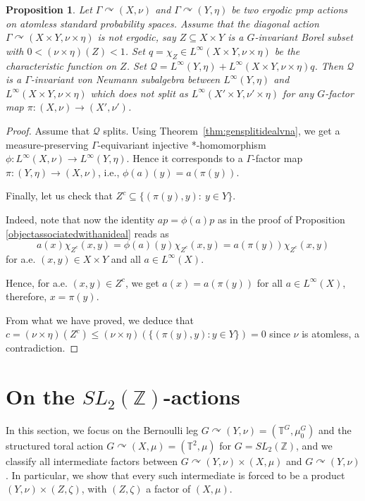 \documentclass[12pt]{amsart}
\newtheorem{proposition}[thm]{Proposition}
\theoremstyle{definition}
\begin{document}
\begin{proposition}
\label{prop:abelianvnanonsplitting}
Let $\Gamma\curvearrowright (X,\nu)$ and $\Gamma\curvearrowright (Y,\eta)$ be two  ergodic pmp actions on atomless standard probability spaces. Assume that the diagonal action $\Gamma\curvearrowright (X\times Y,\nu\times \eta)$ is not ergodic, say $Z\subseteq X\times Y$ is a $G$-invariant Borel subset with $0<(\nu\times\eta)(Z)<1$. Set $q=\chi_Z\in L^{\infty}(X\times Y,\nu\times\eta)$ be the characteristic function on $Z$.  Set $\mathcal{Q}=L^{\infty}(Y,\eta)+L^{\infty}(X\times Y,\nu\times\eta)q$. Then $\mathcal{Q}$ is a $\Gamma$-invariant von Neumann subalgebra between $L^{\infty}(Y,\eta)$ and $L^{\infty}(X\times Y,\nu\times\eta)$ which does not split as $L^{\infty}(X'\times Y,\nu'\times\eta)$ for any $G$-factor map $\pi: (X,\nu)\rightarrow (X',\nu')$.  
\end{proposition}
\begin{proof}
Assume that $\mathcal{Q}$ splits.
Using Theorem~\ref{thm:gensplitidealvna}, we get a measure-preserving $\Gamma$-equivariant injective *-homomorphism $\phi: L^{\infty}(X,\nu)\rightarrow L^{\infty}(Y,\eta)$. Hence it corresponds to a $\Gamma$-factor map $\pi: (Y,\eta)\rightarrow (X,\nu)$, i.e., $\phi(a)(y)=a(\pi(y))$.

Finally, let us check that $Z^c\subseteq \{(\pi(y),y):~y\in Y\}$.

Indeed, note that now the identity $ap=\phi(a)p$ as in the proof of Proposition \ref{objectassociatedwithanideal} reads as \[a(x)\chi_{Z^c}(x, y)=\phi(a)(y)\chi_{Z^c}(x, y)=a(\pi(y))\chi_{Z^c}(x, y)\] for a.e. $(x, y)\in X\times Y$ and all $a\in L^{\infty}(X)$. 

Hence, for a.e. $(x, y)\in Z^c$,  we get $a(x)=a(\pi(y))$ for all $a\in L^{\infty}(X)$, therefore, $x=\pi(y)$.

From what we have proved, we deduce that 
$c=(\nu\times \eta)(Z^c)\leq (\nu\times \eta)(\{(\pi(y), y): y\in Y\})=0$ since $\nu$ is atomless, a contradiction.
\end{proof}
\section{On the \texorpdfstring{$SL_2(\mathbb{Z})$}{}-actions}
\label{sec:SL_2(Z)}
In this section, we focus on the   Bernoulli leg
\(G\curvearrowright (Y,\nu)=(\mathbb T^{G},\mu_0^{G})\)
and the structured toral action
\(G\curvearrowright (X,\mu)=(\mathbb T^2,\mu)\) for \(G=SL_2(\mathbb Z)\),
and we classify all intermediate factors between
\(G\curvearrowright (Y,\nu)\times (X,\mu)\) and \(G\curvearrowright (Y,\nu)\).
In particular, we show that every such intermediate is forced to be a
product \( (Y,\nu)\times (Z,\zeta) \), with \( (Z,\zeta) \) a factor of \( (X,\mu) \).
\end{document}
